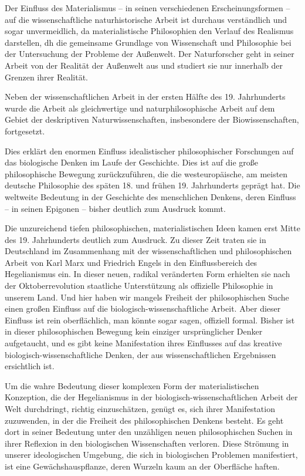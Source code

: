 \documentclass[11pt,a4paper]{book}
\begin{document}
Der Einfluss des Materialismus -- in seinen verschiedenen Erscheinungsformen -- auf die wissenschaftliche naturhistorische Arbeit ist durchaus verständlich und sogar unvermeidlich, da materialistische Philosophien den Verlauf des Realismus darstellen, dh die gemeinsame Grundlage von Wissenschaft und Philosophie bei der Untersuchung der Probleme der Außenwelt. Der Naturforscher geht in seiner Arbeit von der Realität der Außenwelt aus und studiert sie nur innerhalb der Grenzen ihrer Realität.



Neben der wissenschaftlichen Arbeit in der ersten Hälfte des 19. Jahrhunderts wurde die Arbeit als gleichwertige und naturphilosophische Arbeit auf dem Gebiet der deskriptiven Naturwissenschaften, insbesondere der Biowissenschaften, fortgesetzt.



Dies erklärt den enormen Einfluss idealistischer philosophischer Forschungen auf das biologische Denken im Laufe der Geschichte. Dies ist auf die große philosophische Bewegung zurückzuführen, die die westeuropäische, am meisten deutsche Philosophie des späten 18. und frühen 19. Jahrhunderts geprägt hat. Die weltweite Bedeutung in der Geschichte des menschlichen Denkens, deren Einfluss -- in seinen Epigonen -- bisher deutlich zum Ausdruck kommt.



Die unzureichend tiefen philosophischen, materialistischen Ideen kamen erst Mitte des 19. Jahrhunderts deutlich zum Ausdruck. Zu dieser Zeit traten sie in Deutschland im Zusammenhang mit der wissenschaftlichen und philosophischen Arbeit von Karl Marx und Friedrich Engels in den Einflussbereich des Hegelianismus ein. In dieser neuen, radikal veränderten Form erhielten sie nach der Oktoberrevolution staatliche Unterstützung als offizielle Philosophie in unserem Land. Und hier haben wir mangels Freiheit der philosophischen Suche einen großen Einfluss auf die biologisch-wissenschaftliche Arbeit. Aber dieser Einfluss ist rein oberflächlich, man könnte sogar sagen, offiziell formal. Bisher ist in dieser philosophischen Bewegung kein einziger ursprünglicher Denker aufgetaucht, und es gibt keine Manifestation ihres Einflusses auf das kreative biologisch-wissenschaftliche Denken, der aus wissenschaftlichen Ergebnissen ersichtlich ist.



Um die wahre Bedeutung dieser komplexen Form der materialistischen Konzeption, die der Hegelianismus in der biologisch-wissenschaftlichen Arbeit der Welt durchdringt, richtig einzuschätzen, genügt es, sich ihrer Manifestation zuzuwenden, in der die Freiheit des philosophischen Denkens besteht. Es geht dort in seiner Bedeutung unter den unzähligen neuen philosophischen Suchen in ihrer Reflexion in den biologischen Wissenschaften verloren. Diese Strömung in unserer ideologischen Umgebung, die sich in biologischen Problemen manifestiert, ist eine Gewächshauspflanze, deren Wurzeln kaum an der Oberfläche haften.
\end{document}
